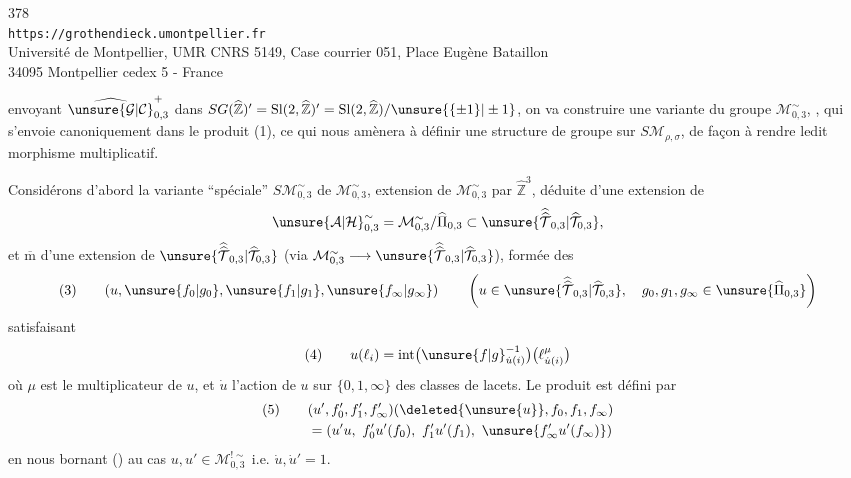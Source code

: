 \begin{center}
378\\
\texttt{https://grothendieck.umontpellier.fr}\\
Université de Montpellier, UMR CNRS 5149, Case courrier 051, Place Eugène Bataillon\\
34095 Montpellier cedex 5 - France
\end{center}


envoyant $\widehat{\unsure{\mathcal{G}|\mathcal{C}}}_{0,3}^{+}$ dans
$SG(\widehat{\mathbb{Z}})'=\mathrm{Sl}(2,\widehat{\mathbb{Z}})'
=\mathrm{Sl}(2,\widehat{\mathbb{Z}})/\unsure{\{\pm1\}|\pm1}$,
on va construire une variante du groupe $\mathcal{M}_{0,3}^{\sim}$,
, qui s'envoie canoniquement dans le produit (1),
ce qui nous amènera à définir une structure de groupe sur
$S\mathcal{M}_{\rho,\sigma}$, de façon à rendre ledit morphisme
multiplicatif.

Considérons d'abord la variante ``spéciale''
$S\mathcal{M}_{0,3}^{\sim}$ de $\mathcal{M}_{0,3}^{\sim}$, extension
de $\mathcal{M}_{0,3}^{\sim}$ par $\widehat{\mathbb{Z}}^3$,
déduite d'une extension de
\[
\unsure{\mathcal{A}|\mathcal{H}}_{0,3}^{\sim}
=\mathcal{M}_{0,3}^{\sim}/\widehat{\Pi}_{0,3}
\subset\unsure{\widehat{\widehat{\mathcal{T}}}_{0,3}|\widehat{\mathcal{T}}_{0,3}},
\]
 et $\overline{\mathrm m}$ d'une extension de
$\unsure{\widehat{\widehat{\mathcal{T}}}_{0,3}|\widehat{\mathcal{T}}_{0,3}}$
(via $\mathcal{M}_{0,3}^{\sim}\longrightarrow
\unsure{\widehat{\widehat{\mathcal{T}}}_{0,3}|\widehat{\mathcal{T}}_{0,3}}$),
formée des
\[
(3)\qquad
(u,\unsure{f_0|g_0},\unsure{f_1|g_1},\unsure{f_\infty|g_\infty})
\qquad
\left(u\in\unsure{\widehat{\widehat{\mathcal{T}}}_{0,3}|\widehat{\mathcal{T}}_{0,3}},\quad
g_0,g_1,g_\infty\in\unsure{\widehat{\Pi}_{0,3}}\right)
\]
satisfaisant
\[
(4)\qquad
u(\ell_i)=\operatorname{int}\bigl(\unsure{f|g}_{\dot{u}(i)}^{-1}\bigr)
\bigl(\ell_{\dot{u}(i)}^{\mu}\bigr)
\]
où $\mu$ est le multiplicateur de $u$, et $\dot{u}$ l'action de $u$
sur  $\{0,1,\infty\}$ des classes de lacets.
Le produit est défini par
\[
\begin{aligned}
(5)\qquad &(u',f'_0,f'_1,f'_\infty)
(\deleted{\unsure{u}},f_0,f_1,f_\infty)\\
&=(u'u,\ f'_0u'(f_0),\ f'_1u'(f_1),\ \unsure{f'_\infty u'(f_\infty)})
\end{aligned}
\]
en nous bornant () au cas
$u,u'\in\mathcal{M}_{0,3}^{!\sim}$ i.e. $\dot{u},\dot{u}'=1$.


